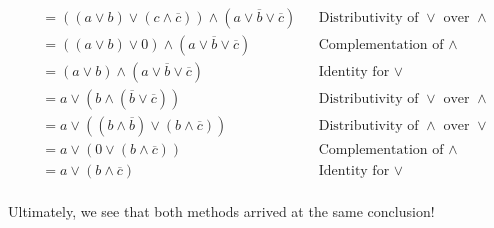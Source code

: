 \documentclass[10pt]{article}
\begin{document}
\begin{align}
&= ((a \lor b) \lor
	(c \land \overline{c})) \land
	(a \lor \overline{b} \lor \overline{c})			&& \text{Distributivity of $\lor$ over $\land$}\\
&= ((a \lor b) \lor
	0) \land
	(a \lor \overline{b} \lor \overline{c})			&& \text{Complementation of $\land$}\\
&= (a \lor b) \land
	(a \lor \overline{b} \lor \overline{c})			&& \text{Identity for $\lor$}\\
&= a \lor (b \land (\overline{b} \lor \overline{c}))	&& \text{Distributivity of $\lor$ over $\land$}\\
&= a \lor ((b \land \overline{b}) \lor 
	(b \land \overline{c}))							&& \text{Distributivity of $\land$ over $\lor$}\\
&= a \lor (0 \lor 
	(b \land \overline{c}))							&& \text{Complementation of $\land$}\\
&= a \lor
	(b \land \overline{c})							&& \text{Identity for $\lor$}\\
\end{align}

Ultimately, we see that both methods arrived at the same conclusion!

	
\end{document}
